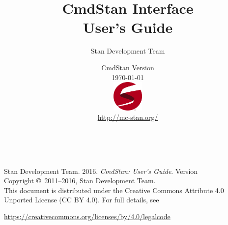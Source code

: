 \title{\Huge\bf CmdStan Interface \\[4pt] {\LARGE User's Guide}}
\author{Stan Development Team}

\date{\vspace*{36pt} CmdStan Version \cmdstanversion
\\[8pt] {\small \today}
\\[36pt]
{
\vfill
\includegraphics[width=0.6in]{img/logo_tm.png}}
\\
\vspace*{6pt}
{\small \url{http://mc-stan.org/}}
}
\maketitle

\newpage
\thispagestyle{empty}
\mbox{ }
\vfill
\begin{center}
\begin{minipage}[t]{0.75\textwidth}
\small
Stan Development Team. 2016.
{\it CmdStan: User's Guide}. Version
\cmdstanversion
\vspace*{20pt}
\mbox{ }
\\
Copyright \copyright \ 2011--2016, Stan Development Team.
\vspace*{28pt}
\mbox{} \\
This document is distributed under the Creative Commons Attribute 4.0
Unported License (CC BY 4.0).  For full details, see
\begin{center}
\url{https://creativecommons.org/licenses/by/4.0/legalcode}
\end{center}
\end{minipage}
\vspace*{24pt}
\mbox{ }
\end{center}

